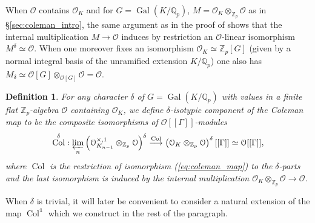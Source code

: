 \documentclass[12pt]{amsart}
\newcommand\Zp{{\mathbb{Z}_p}}
\newcommand\Qp{{\mathbb{Q}_p}}
\newcommand\cO{\mathcal{O}}
\DeclareMathOperator{\Gal}{Gal}
\DeclareMathOperator{\Coleman}{Col}
\theoremstyle{defstyle}
\newtheorem{definition}[subsubsection]{Definition}
\theoremstyle{thmstyle}
\begin{document}
When $\cO$ contains $\cO_K$ and for $G=\Gal(K/\Qp)$, $M=\cO_K \otimes_{\Zp} \cO$ as in \S\ref{sec:coleman_intro}, the same argument as in the proof of \cite[Lemme 3.2.3]{maks} shows that the internal multiplication $M\longrightarrow \cO$ induces by restriction an $\cO$-linear isomorphism $M^{\delta}\simeq \cO$. When one moreover fixes an isomorphism $\cO_K\simeq \Zp[G]$ (given by a normal integral basis of the unramified extension $K/\Qp$) one also has $M_{\delta}\simeq \cO[G] \otimes_{\cO[G]}\cO = \cO$.

\begin{definition}\label{def:coleman_isotypic}
	For any character $\delta$ of $G=\Gal(K/\Qp)$ with values in a finite flat $\Zp$-algebra $\cO$ containing $\cO_K$, we define $\delta$-isotypic component of the Coleman map to be the composite isomorphisms of $\cO[[\Gamma]]$-modules
	$$
	\Coleman^{\delta} : \varprojlim_n \left(\cO^{\times,1}_{K_{n-1}} \otimes_{\Zp}\cO\right)^\delta \overset{\Coleman}{\longrightarrow} \left(\cO_K \otimes_{\Zp} \cO\right)^\delta[[\Gamma]]\simeq \cO[[\Gamma]], 
	$$
	where $\Coleman$ is the restriction of isomorphism (\ref{eq:coleman_map}) to the $\delta$-parts and  the last isomorphism is induced by the internal multiplication $\cO_K \otimes_{\Zp} \cO \longrightarrow \cO$.
\end{definition} 
When $\delta$ is trivial, it will later be convenient to consider a natural extension of the map $\Coleman^\mathds{1}$ which we construct in the rest of the paragraph. 
\end{document}
